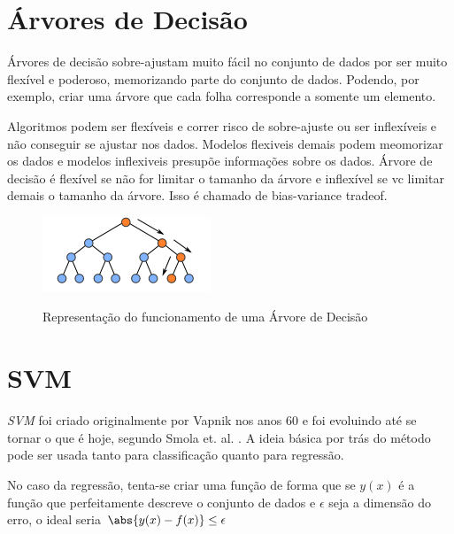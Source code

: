 \section{Árvores de Decisão}


Árvores de decisão sobre-ajustam muito fácil no conjunto de dados por ser muito flexível e poderoso, memorizando parte do conjunto de dados. Podendo, por exemplo, criar uma árvore que cada folha corresponde a somente um elemento.

 Algoritmos podem ser flexíveis e correr risco de sobre-ajuste ou ser inflexíveis e não conseguir se ajustar nos dados. Modelos flexiveis demais podem  meomorizar os dados e modelos inflexiveis presupõe informações sobre os dados.
 Árvore de decisão é flexível se não for limitar o tamanho da árvore e inflexível se vc limitar demais o tamanho da árvore. Isso é chamado de bias-variance tradeof.
 
 \begin{figure}[h]
    \centering
    \includegraphics[scale=1.5]{monography/img/decision_tree.png}
    \label{figure:decision_tree}
    \caption[Representação do funcionamento de uma Árvore de Decisão]{Representação do funcionamento de uma Árvore de Decisão\footnotemark}
\end{figure}


\section{\acrfull{SVM}}

\textit{\acrshort{SVM}} foi criado originalmente por Vapnik nos anos 60 e foi evoluindo até se tornar o que é hoje, segundo Smola et. al. \cite{Smola03atutorial}. A ideia básica por trás do método pode ser usada tanto para classificação quanto para regressão. 

No caso da regressão, tenta-se criar uma função  de forma que se \(y(x)\) é a função que perfeitamente descreve o conjunto de dados e \(\epsilon\) seja a dimensão do erro, o ideal seria \(\abs{y(x) - f(x)} \leq \epsilon \)

